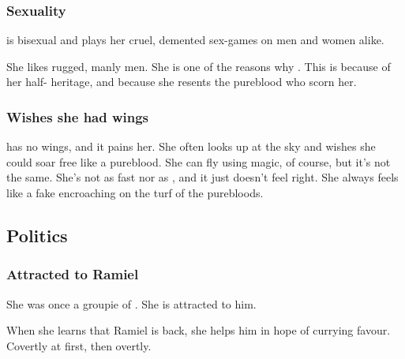 





\subsubsection{Sexuality}
\Achsah{} is bisexual and plays her cruel, demented sex-games on men and women alike.

She likes rugged, manly men. 
She is one of the reasons why . 
This is because of her half-\nephil{} heritage, and because she resents the pureblood \resphain{} who scorn her. 






\subsubsection{Wishes she had wings}
\Achsah{} has no wings, and it pains her. 
She often looks up at the sky and wishes she could soar free like a pureblood. 
She can fly using magic, of course, but it's not the same. 
She's not as fast nor as \manoeuvrable, and it just doesn't feel right. 
She always feels like a fake encroaching on the turf of the purebloods. 







\subsection{Politics}





\subsubsection{Attracted to Ramiel}
She was once a groupie of . She is attracted to him. 

When she learns that Ramiel is back, she helps him in hope of currying favour. Covertly at first, then overtly.





